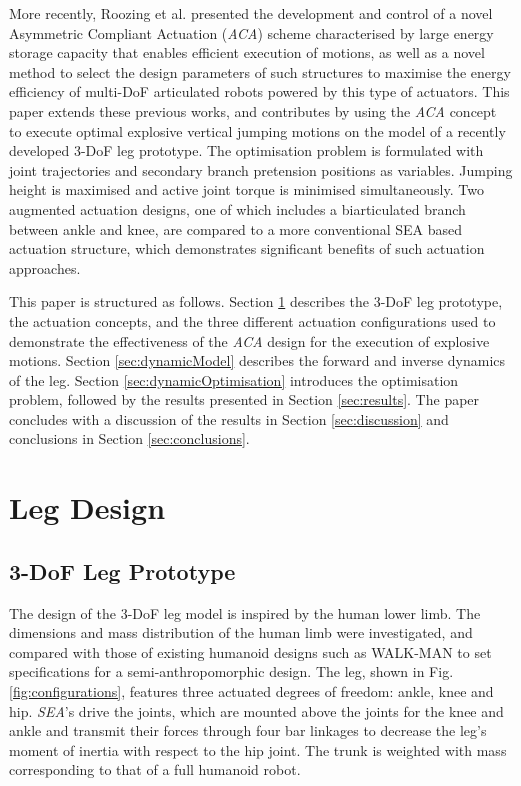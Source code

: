 \documentclass[letterpaper, 10 pt, conference]{ieeeconf}  %
\begin{document}
	More recently, Roozing et al. \cite{roozing2016development, roozing2016design} presented the development and control of a novel Asymmetric Compliant Actuation (\textit{ACA}) scheme characterised by large energy storage capacity that enables efficient execution of motions, as well as a novel method to select the design parameters of such structures to maximise the energy efficiency of multi-DoF articulated robots powered by this type of actuators. This paper extends these previous works, and contributes by using the \textit{ACA} concept to execute optimal explosive vertical jumping motions on the model of a recently developed 3-DoF leg prototype. The optimisation problem is formulated with joint trajectories and secondary branch pretension positions as variables. Jumping height is maximised and active joint torque is minimised simultaneously. Two augmented actuation designs, one of which includes a biarticulated branch between ankle and knee, are compared to a more conventional SEA based actuation structure, which demonstrates significant benefits of such actuation approaches.
	
	This paper is structured as follows. Section \ref{sec:legDesign} describes the 3-DoF leg prototype, the actuation concepts, and the three different actuation configurations used to demonstrate the effectiveness of the \textit{ACA} design for the execution of explosive motions. Section \ref{sec:dynamicModel} describes the forward and inverse dynamics of the leg. Section \ref{sec:dynamicOptimisation} introduces the optimisation problem, followed by the results presented in Section \ref{sec:results}. The paper concludes with a discussion of the results in Section \ref{sec:discussion} and conclusions in Section \ref{sec:conclusions}.
	
	
	\section{Leg Design } \label{sec:legDesign}
	
	\subsection{3-DoF Leg Prototype}
	
	The design of the 3-DoF leg model is inspired by the human lower limb. The dimensions and mass distribution of the human limb were investigated, and compared with those of existing humanoid designs such as WALK-MAN \cite{tsagarakis2017walk} to set specifications for a semi-anthropomorphic design. The leg, shown in Fig. \ref{fig:configurations}, features three actuated degrees of freedom: ankle, knee and hip. \textit{SEA}'s drive the joints, which are mounted above the joints for the knee and ankle and transmit their forces through four bar linkages to decrease the leg’s moment of inertia with respect to the hip joint. The trunk is weighted with mass corresponding to that of a full humanoid robot.
	
\end{document}

